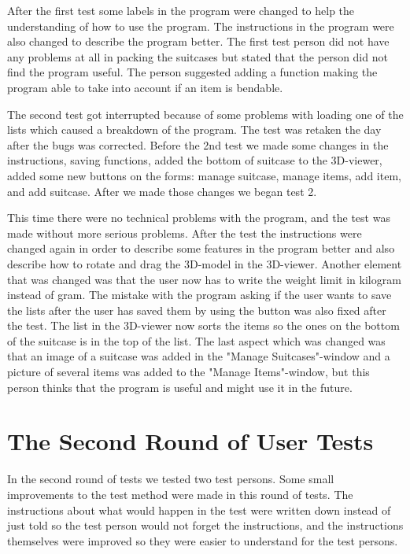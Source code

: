 After the first test some labels in the program were changed to help the understanding of how to use the program. The instructions in the program were also changed to describe the program better. The first test person did not have any problems at all in packing the suitcases but stated that the person did not find the program useful. The person suggested adding a function making the program able to take into account if an item is bendable.

The second test got interrupted because of some problems with loading one of the lists which caused a breakdown of the program. The test was retaken the day after the bugs was corrected. Before the 2nd test we made some changes in the instructions, saving functions, added the bottom of suitcase to the 3D-viewer, added some new buttons on the forms: manage suitcase, manage items, add item, and add suitcase. After we made those changes we began test 2.

This time there were no technical problems with the program, and the test was made without more serious problems. After the test the instructions were changed again in order to describe some features in the program better and also describe how to rotate and drag the 3D-model in the 3D-viewer. Another element that was changed was that the user now has to write the weight limit in kilogram instead of gram. The mistake with the program asking if the user wants to save the lists after the user has saved them by using the button was also fixed after the test. The list in the 3D-viewer now sorts the items so the ones on the bottom of the suitcase is in the top of the list. The last aspect which was changed was that an image of a suitcase was added in the "Manage Suitcases"-window and a picture of several items was added to the "Manage Items"-window, but this person thinks that the program is useful and might use it in the future.

\section{The Second Round of User Tests}
In the second round of tests we tested two test persons. Some small improvements to the test method were made in this round of tests. The instructions about what would happen in the test were written down instead of just told so the test person would not forget the instructions, and the instructions themselves were improved so they were easier to understand for the test persons.

